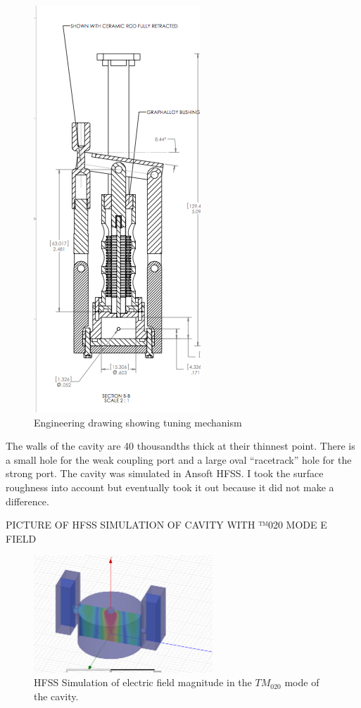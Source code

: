 \documentclass[11pt]{article}
\begin{document}
\begin{figure}
\includegraphics[scale=0.7]{AxionEngineeringDrawing}
\caption{Engineering drawing showing tuning mechanism}
\end{figure}

The walls of the cavity are 40 thousandths thick at their thinnest point. There is a small hole for the weak coupling port and a large oval “racetrack” hole for the strong port.  The cavity was simulated in Ansoft HFSS. I took the surface roughness into account but eventually took it out because it did not make a difference. 

PICTURE OF HFSS SIMULATION OF CAVITY WITH ™020 MODE E FIELD
\begin{figure}
\includegraphics[width=0.6\textwidth]{efieldhfsssim28thou}
\caption{HFSS Simulation of electric field magnitude in the $TM_{020}$ mode of the cavity.}
\end{figure}
\end{document}
